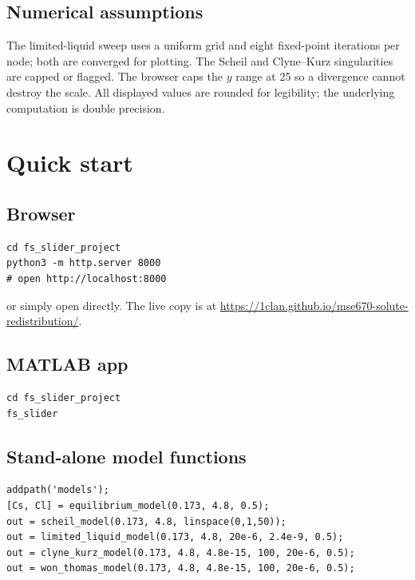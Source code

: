 \documentclass[11pt,a4paper]{article}
\newcommand{\code}[1]{\texttt{\detokenize{#1}}}
\begin{document}
\subsection*{Numerical assumptions}

The limited-liquid sweep uses a uniform grid and eight fixed-point iterations
per node; both are converged for plotting. The Scheil and Clyne--Kurz
singularities are capped or flagged. The browser caps the $y$ range at 25 so a
divergence cannot destroy the scale. All displayed values are rounded for
legibility; the underlying computation is double precision.

\section{Quick start}
\label{sec:run}

\subsection*{Browser}

\begin{verbatim}
cd fs_slider_project
python3 -m http.server 8000
# open http://localhost:8000
\end{verbatim}
or simply open \code{index.html} directly. The live copy is at
\url{https://1clan.github.io/mse670-solute-redistribution/}.

\subsection*{MATLAB app}

\begin{verbatim}
cd fs_slider_project
fs_slider
\end{verbatim}

\subsection*{Stand-alone model functions}

\begin{verbatim}
addpath('models');
[Cs, Cl] = equilibrium_model(0.173, 4.8, 0.5);
out = scheil_model(0.173, 4.8, linspace(0,1,50));
out = limited_liquid_model(0.173, 4.8, 20e-6, 2.4e-9, 0.5);
out = clyne_kurz_model(0.173, 4.8, 4.8e-15, 100, 20e-6, 0.5);
out = won_thomas_model(0.173, 4.8, 4.8e-15, 100, 20e-6, 0.5);
\end{verbatim}
\end{document}
